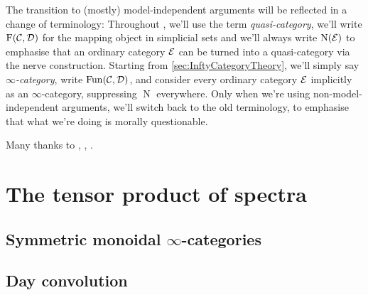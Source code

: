 \documentclass[DIV=12,numbers=enddot,leqno,bibliography=totoc]{scrartcl}
\newcommand{\N}{\operatorname{N}}
\newcommand{\F}{\operatorname{F}}
\theoremstyle{csatanicthm}
\begin{document}
\begin{numpar}
		The transition to (mostly) model-independent arguments will be reflected in a change of terminology: Throughout , we'll use the term  \emph{quasi-category}, we'll write $\F(\Cc,\Dd)$ for the mapping object in simplicial sets and we'll always write $\N(\Ee)$ to emphasise that an ordinary category $\mathcal{E}$ can be turned into a quasi-category via the nerve construction. Starting from \cref{sec:InftyCategoryTheory}, we'll simply say \emph{$\infty$-category}, write $\operatorname{Fun}(\mathcal{C},\mathcal{D})$, and consider every ordinary category $\mathcal{E}$ implicitly as an $\infty$-category, suppressing $\N$ everywhere. Only when we're using non-model-independent arguments, we'll switch back to the old terminology, to emphasise that what we're doing is morally questionable.
	\end{numpar}
	\begin{numpar}[Acknowledgments.]
		[TODO] Many thanks to \cite{HigherCatsI}, \cite{HigherCatsII}, \cite{KTheory}.
	\end{numpar}
	
	\newpage
	
	
	
	
	
	\newpage
	
	
	
	
	\newpage
	\section{The tensor product of spectra}\label{sec:TensorProduct}
	\subsection{Symmetric monoidal \texorpdfstring{$\infty$}{Infinity}-categories}
	
	\subsection{Day convolution}
	
\end{document}
